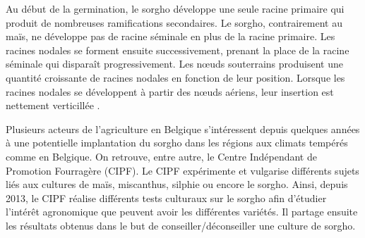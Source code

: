 Au début de la germination, le sorgho développe une seule racine primaire qui produit de nombreuses ramifications secondaires.
Le sorgho, contrairement au maïs, ne développe pas de racine séminale en plus de la racine primaire.
Les racines nodales se forment ensuite successivement, prenant la place de la racine séminale qui disparaît progressivement.
Les nœuds souterrains produisent une quantité croissante de racines nodales en fonction de leur position.
Lorsque les racines nodales se développent à partir des nœuds aériens, leur insertion est nettement verticillée \citep{kumar_goyal_how_2021}.
\newline

Plusieurs acteurs de l'agriculture en Belgique s'intéressent depuis quelques années à une potentielle implantation du sorgho dans les régions aux climats tempérés comme en Belgique.
On retrouve, entre autre, le Centre Indépendant de Promotion Fourragère (CIPF).
Le CIPF expérimente et vulgarise différents sujets liés aux cultures de maïs, miscanthus, silphie ou encore le sorgho.
Ainsi, depuis 2013, le CIPF réalise différents tests culturaux sur le sorgho afin d'étudier l'intérêt agronomique que peuvent avoir les différentes variétés.
Il partage ensuite les résultats obtenus dans le but de conseiller/déconseiller une culture de sorgho.